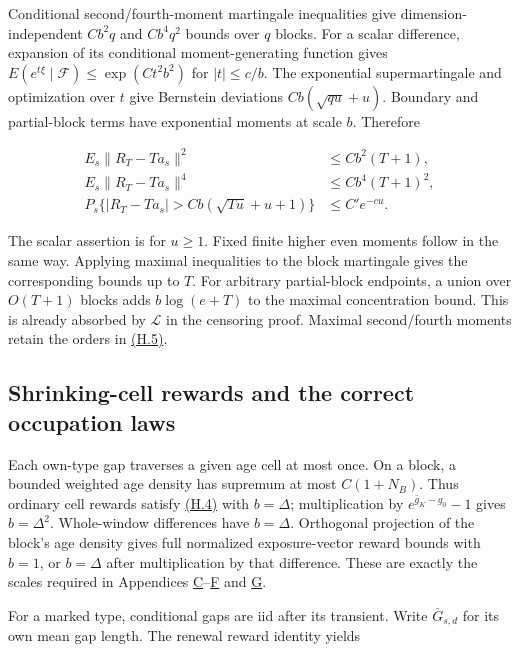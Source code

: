 \documentclass[11pt]{article}
\begin{document}
Conditional second/fourth-moment martingale inequalities give dimension-independent \(Cb^2q\) and \(Cb^4q^2\) bounds over \(q\) blocks. For a scalar difference, expansion of its conditional moment-generating function gives
\(E(e^{t\xi}\mid\mathcal F)\leq\exp(Ct^2b^2)\) for \(|t|\leq c/b\).
The exponential supermartingale and optimization over \(t\) give Bernstein deviations \(Cb(\sqrt{qu}+u)\). Boundary and partial-block terms have exponential moments at scale \(b\). Therefore

\begin{equation*}
\begin{aligned}
E_s\|R_T-Ta_s\|^2&\leq Cb^2(T+1),\\
E_s\|R_T-Ta_s\|^4&\leq Cb^4(T+1)^2,\\
P_s\{|R_T-Ta_s|>Cb(\sqrt{Tu}+u+1)\}&\leq C'e^{-cu}.
\end{aligned}
\tag{H.5}\label{eq:H.5}
\end{equation*}

The scalar assertion is for \(u\geq1\). Fixed finite higher even moments follow in the same way. Applying maximal inequalities to the block martingale gives the corresponding bounds up to \(T\). For arbitrary partial-block endpoints, a union over \(O(T+1)\) blocks adds \(b\log(e+T)\) to the maximal concentration bound. This is already absorbed by \(\mathscr L\) in the censoring proof. Maximal second/fourth moments retain the orders in \hyperref[eq:H.5]{(H.5)}.

\subsection{Shrinking-cell rewards and the correct occupation laws}\label{sec:H.3}

Each own-type gap traverses a given age cell at most once. On a block, a bounded weighted age density has supremum at most \(C(1+N_B)\). Thus ordinary cell rewards satisfy \hyperref[eq:H.4]{(H.4)} with \(b=\Delta\); multiplication by \(e^{\bar g_K-g_0}-1\) gives \(b=\Delta^2\). Whole-window differences have \(b=\Delta\). Orthogonal projection of the block's age density gives full normalized exposure-vector reward bounds with \(b=1\), or \(b=\Delta\) after multiplication by that difference. These are exactly the scales required in Appendices \hyperref[sec:C]{C}--\hyperref[sec:F]{F} and \hyperref[sec:G]{G}.

For a marked type, conditional gaps are iid after its transient. Write \(\overline G_{s,d}\) for its own mean gap length. The renewal reward identity yields
\end{document}
